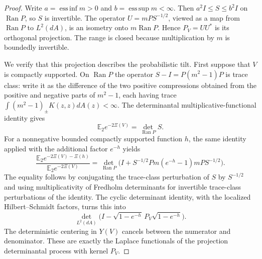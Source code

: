 \documentclass[11pt,a4paper]{article}
\numberwithin{equation}{section}
\theoremstyle{definition}
\theoremstyle{remark}
\begin{document}
\begin{proof}
Write $a=\operatorname*{ess\,inf}m>0$ and
$b=\operatorname*{ess\,sup}m<\infty$.  Then
$a^2 I\le S\le b^2 I$ on $\operatorname{Ran}P$, so $S$ is
invertible.  The operator $U=mP S^{-1/2}$, viewed as a map from
$\operatorname{Ran}P$ to $L^2(dA)$, is an isometry onto
$m\operatorname{Ran}P$.  Hence $P_V=UU^*$ is its orthogonal
projection.  The range is closed because multiplication by $m$ is
boundedly invertible.

We verify that this projection describes the probabilistic tilt.
First suppose that $V$ is compactly supported.  On
$\operatorname{Ran}P$ the operator $S-I=P(m^2-1)P$ is trace class:
write it as the difference of the two positive compressions obtained
from the positive and negative parts of $m^2-1$, each having trace
$\int (m^2-1)_\pm K(z,z)dA(z)<\infty$.  The determinantal
multiplicative-functional identity gives
\[
 \mathbb E_2 e^{-2\Xi(V)}=\det_{\operatorname{Ran}P} S.
\]
For a nonnegative bounded compactly supported function $h$, the same
identity applied with the additional factor $e^{-h}$ yields
\[
 \frac{\mathbb E_2 e^{-2\Xi(V)-\Xi(h)}}
      {\mathbb E_2 e^{-2\Xi(V)}}
 =\det_{\operatorname{Ran}P}
    \bigl(I+S^{-1/2}Pm(e^{-h}-1)mP S^{-1/2}\bigr).
\]
The equality follows by conjugating the trace-class perturbation of
$S$ by $S^{-1/2}$ and using multiplicativity of Fredholm
determinants for invertible trace-class perturbations of the identity.
The cyclic determinant identity, with the localized Hilbert--Schmidt
factors, turns this into
\[
 \det_{L^2(dA)}
  \bigl(I-\sqrt{1-e^{-h}}\,P_V\sqrt{1-e^{-h}}\bigr).
\]
The deterministic centering in $Y(V)$ cancels between the numerator
and denominator.  These are exactly the Laplace functionals of the
projection determinantal process with kernel $P_V$.


\end{proof}
\end{document}
